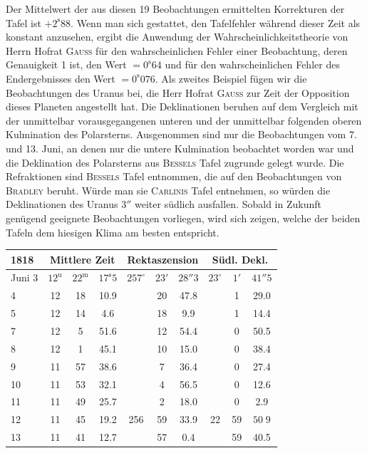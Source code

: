 \par\indent Der Mittelwert der aus diesen 19 Beobachtungen ermittelten Korrekturen der Tafel ist $+2^{\mathrm{s}}88$. Wenn man sich gestattet, den Tafelfehler während dieser Zeit als konstant anzusehen, ergibt die Anwendung der Wahrscheinlichkeitstheorie von Herrn Hofrat \textsc{Gauss} für den wahrscheinlichen Fehler einer Beobachtung, deren Genauigkeit 1 ist, den Wert $=0^{\mathrm{s}}64$ und für den wahrscheinlichen Fehler des Endergebnisses den Wert $=0^{\mathrm{s}}076$. Als zweites Beispiel fügen wir die Beobachtungen des Uranus bei, die Herr Hofrat \textsc{Gauss} zur Zeit der Opposition dieses Planeten angestellt hat. Die Deklinationen beruhen auf dem Vergleich mit der unmittelbar vorausgegangenen unteren und der unmittelbar folgenden oberen Kulmination des Polarsterns. Ausgenommen sind nur die Beobachtungen vom 7. und 13. Juni, an denen nur die untere Kulmination beobachtet worden war und die Deklination des Polarsterns aus \textsc{Bessels} Tafel zugrunde gelegt wurde. Die Refraktionen sind \textsc{Bessels} Tafel entnommen, die auf den Beobachtungen von \textsc{Bradley} beruht. Würde man sie \textsc{Carlinis} Tafel entnehmen, so würden die Deklinationen des Uranus $3''$ weiter südlich ausfallen. Sobald in Zukunft genügend geeignete Beobachtungen vorliegen, wird sich zeigen, welche der beiden Tafeln dem hiesigen Klima am besten entspricht.

\begin{center}
\setlength{\tabcolsep}{3pt}
\begin{tabular}{l|ccc|ccc|ccc}
\hline
1818 & \multicolumn{3}{c|}{Mittlere Zeit} & \multicolumn{3}{c|}{Rektaszension} & \multicolumn{3}{c}{Südl. Dekl.} \\
\hline
Juni 3 & $12^{\mathrm u}$ & $22^{\mathrm m}$ & $17^{\mathrm s}5$ & $257^\circ$ & $23'$ & $28''3$ & $23^\circ$ & $1'$ & $41''5$ \\
4 & 12 & 18 & 10.9 & & 20 & 47.8 & & 1 & 29.0 \\
5 & 12 & 14 & 4.6 & & 18 & 9.9 & & 1 & 14.4 \\
7 & 12 & 5 & 51.6 & & 12 & 54.4 & & 0 & 50.5 \\
8 & 12 & 1 & 45.1 & & 10 & 15.0 & & 0 & 38.4 \\
9 & 11 & 57 & 38.6 & & 7 & 36.4 & & 0 & 27.4 \\
10 & 11 & 53 & 32.1 & & 4 & 56.5 & & 0 & 12.6 \\
11 & 11 & 49 & 25.7 & & 2 & 18.0 & & 0 & 2.9 \\
12 & 11 & 45 & 19.2 & 256 & 59 & 33.9 & 22 & 59 & $50\;9$ \\ 
13 & 11 & 41 & 12.7 & & 57 & 0.4 & & 59 & 40.5 \\
\hline
\end{tabular}
\end{center}

